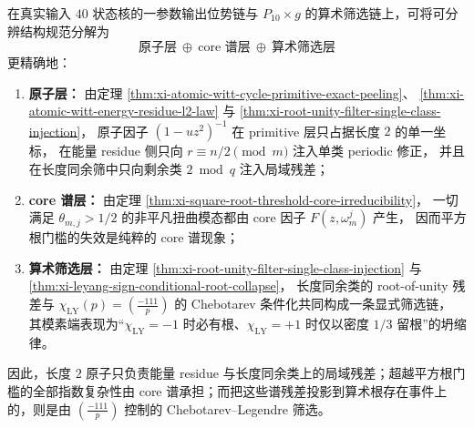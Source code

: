 \begin{corollary}\label{cor:xi-atomic-core-arithmetic-trichotomy}
在真实输入 \(40\) 状态核的一参数输出位势链与 \(P_{10}\times g\) 的算术筛选链上，可将可分辨结构规范分解为
\[
\boxed{\;
\text{原子层}\ \oplus\ \text{core 谱层}\ \oplus\ \text{算术筛选层}\;}
\]
更精确地：
\begin{enumerate}
  \item \textbf{原子层：}
        由定理 \ref{thm:xi-atomic-witt-cycle-primitive-exact-peeling}、
        \ref{thm:xi-atomic-witt-energy-residue-l2-law} 与
        \ref{thm:xi-root-unity-filter-single-class-injection}，
        原子因子 \((1-uz^2)^{-1}\) 在 primitive 层只占据长度 \(2\) 的单一坐标，
        在能量 residue 侧只向 \(r\equiv n/2\pmod m\) 注入单类 periodic 修正，
        并且在长度同余筛中只向剩余类 \(2\bmod q\) 注入局域残差；
  \item \textbf{core 谱层：}
        由定理 \ref{thm:xi-square-root-threshold-core-irreducibility}，
        一切满足 \(\theta_{m,j}>1/2\) 的非平凡扭曲模态都由 core 因子 \(F(z,\omega_m^j)\) 产生，
        因而平方根门槛的失效是纯粹的 core 谱现象；
  \item \textbf{算术筛选层：}
        由定理 \ref{thm:xi-root-unity-filter-single-class-injection} 与
        \ref{thm:xi-leyang-sign-conditional-root-collapse}，
        长度同余类的 root-of-unity 残差与
        \(\chi_{\mathrm{LY}}(p)=\left(\frac{-111}{p}\right)\) 的 Chebotarev 条件化共同构成一条显式筛选链，
        其模素端表现为“\(\chi_{\mathrm{LY}}=-1\) 时必有根、\(\chi_{\mathrm{LY}}=+1\) 时仅以密度 \(1/3\) 留根”的坍缩律。
\end{enumerate}
因此，长度 \(2\) 原子只负责能量 residue 与长度同余类上的局域残差；超越平方根门槛的全部指数复杂性由 core 谱承担；而把这些谱残差投影到算术根存在事件上的，则是由 \(\left(\frac{-111}{p}\right)\) 控制的 Chebotarev--Legendre 筛选。
\end{corollary}







\endinput
